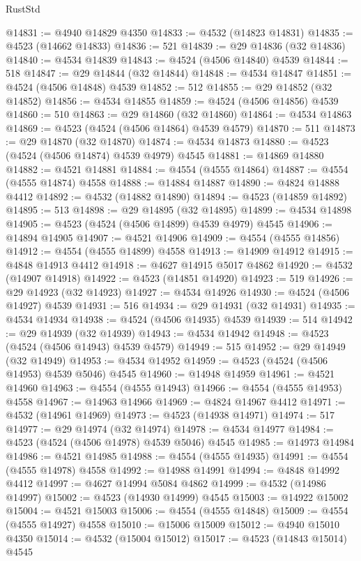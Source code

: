 \begin{lexlean}{RustStd}
\begin{coremodule}
@14831 := @4940 @14829 @4350
@14833 := @4532 (@14823 @14831)
@14835 := @4523 (@14662 @14833)
@14836 := 521
@14839 := @29 @14836 (@32 @14836)
@14840 := @4534 @14839
@14843 := @4524 (@4506 @14840) @4539
@14844 := 518
@14847 := @29 @14844 (@32 @14844)
@14848 := @4534 @14847
@14851 := @4524 (@4506 @14848) @4539
@14852 := 512
@14855 := @29 @14852 (@32 @14852)
@14856 := @4534 @14855
@14859 := @4524 (@4506 @14856) @4539
@14860 := 510
@14863 := @29 @14860 (@32 @14860)
@14864 := @4534 @14863
@14869 := @4523 (@4524 (@4506 @14864) @4539 @4579)
@14870 := 511
@14873 := @29 @14870 (@32 @14870)
@14874 := @4534 @14873
@14880 := @4523 (@4524 (@4506 @14874) @4539 @4979) @4545
@14881 := @14869 @14880
@14882 := @4521 @14881
@14884 := @4554 (@4555 @14864)
@14887 := @4554 (@4555 @14874) @4558
@14888 := @14884 @14887
@14890 := @4824 @14888 @4412
@14892 := @4532 (@14882 @14890)
@14894 := @4523 (@14859 @14892)
@14895 := 513
@14898 := @29 @14895 (@32 @14895)
@14899 := @4534 @14898
@14905 := @4523 (@4524 (@4506 @14899) @4539 @4979) @4545
@14906 := @14894 @14905
@14907 := @4521 @14906
@14909 := @4554 (@4555 @14856)
@14912 := @4554 (@4555 @14899) @4558
@14913 := @14909 @14912
@14915 := @4848 @14913 @4412
@14918 := @4627 @14915 @5017 @4862
@14920 := @4532 (@14907 @14918)
@14922 := @4523 (@14851 @14920)
@14923 := 519
@14926 := @29 @14923 (@32 @14923)
@14927 := @4534 @14926
@14930 := @4524 (@4506 @14927) @4539
@14931 := 516
@14934 := @29 @14931 (@32 @14931)
@14935 := @4534 @14934
@14938 := @4524 (@4506 @14935) @4539
@14939 := 514
@14942 := @29 @14939 (@32 @14939)
@14943 := @4534 @14942
@14948 := @4523 (@4524 (@4506 @14943) @4539 @4579)
@14949 := 515
@14952 := @29 @14949 (@32 @14949)
@14953 := @4534 @14952
@14959 := @4523 (@4524 (@4506 @14953) @4539 @5046) @4545
@14960 := @14948 @14959
@14961 := @4521 @14960
@14963 := @4554 (@4555 @14943)
@14966 := @4554 (@4555 @14953) @4558
@14967 := @14963 @14966
@14969 := @4824 @14967 @4412
@14971 := @4532 (@14961 @14969)
@14973 := @4523 (@14938 @14971)
@14974 := 517
@14977 := @29 @14974 (@32 @14974)
@14978 := @4534 @14977
@14984 := @4523 (@4524 (@4506 @14978) @4539 @5046) @4545
@14985 := @14973 @14984
@14986 := @4521 @14985
@14988 := @4554 (@4555 @14935)
@14991 := @4554 (@4555 @14978) @4558
@14992 := @14988 @14991
@14994 := @4848 @14992 @4412
@14997 := @4627 @14994 @5084 @4862
@14999 := @4532 (@14986 @14997)
@15002 := @4523 (@14930 @14999) @4545
@15003 := @14922 @15002
@15004 := @4521 @15003
@15006 := @4554 (@4555 @14848)
@15009 := @4554 (@4555 @14927) @4558
@15010 := @15006 @15009
@15012 := @4940 @15010 @4350
@15014 := @4532 (@15004 @15012)
@15017 := @4523 (@14843 @15014) @4545

\end{coremodule}
\end{lexlean}
